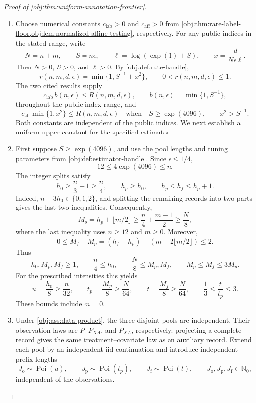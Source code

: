 \documentclass[11pt]{article}
\begin{document}
\begin{proof}[Proof of \cref{obj:thm:uniform-annotation-frontier}]
\begin{enumerate}
\item Choose numerical constants \(c_{\mathrm{lab}}>0\) and \(c_{\mathrm{aff}}>0\) from \cref{obj:thm:rare-label-floor,obj:lem:normalized-affine-testing}, respectively. For any public indices in the stated range, write
\[
N=n+m,\qquad
S=n\epsilon,\qquad
\ell=\log(\exp(1)+S),\qquad
x=\frac{d}{N\epsilon\ell}.
\]
Then \(N>0\), \(S>0\), and \(\ell>0\). By \cref{obj:def:rate-handle},
\[
r(n,m,d,\epsilon)=\min\{1,S^{-1}+x^2\},
\qquad
0<r(n,m,d,\epsilon)\le1.
\]
The two cited results supply
\[
c_{\mathrm{lab}}\,b(n,\epsilon)
\le R(n,m,d,\epsilon),
\qquad
b(n,\epsilon)=\min\{1,S^{-1}\},
\]
throughout the public index range, and
\[
c_{\mathrm{aff}}\min\{1,x^2\}
\le R(n,m,d,\epsilon)
\quad\text{when}\quad
S\ge\exp(4096),\qquad x^2>S^{-1}.
\]
Both constants are independent of the public indices. We next establish a uniform upper constant for the specified estimator.

\item First suppose \(S\ge\exp(4096)\), and use the pool lengths and tuning parameters from \cref{obj:def:estimator-handle}. Since \(\epsilon\le1/4\),
\[
12\le4\exp(4096)\le n.
\]
The integer splits satisfy
\[
h_0\ge\frac n3-1\ge\frac n4,\qquad
h_p\ge h_0,\qquad
h_p\le h_f\le h_p+1.
\]
Indeed, \(n-3h_0\in\{0,1,2\}\), and splitting the remaining records into two parts gives the last two inequalities. Consequently,
\[
M_p
=h_p+\lfloor m/2\rfloor
\ge\frac n4+\frac{m-1}{2}
\ge\frac N8,
\]
where the last inequality uses \(n\ge12\) and \(m\ge0\). Moreover,
\[
0\le M_f-M_p
=(h_f-h_p)+(m-2\lfloor m/2\rfloor)\le2.
\]
Thus
\[
h_0,M_p,M_f\ge1,\qquad
\frac n4\le h_0,\qquad
\frac N8\le M_p,M_f,\qquad
M_p\le M_f\le3M_p.
\]
For the prescribed intensities this yields
\[
u=\frac{h_0}{8}\ge\frac n{32},\qquad
t_p=\frac{M_p}{8}\ge\frac N{64},\qquad
t=\frac{M_f}{8}\ge\frac N{64},\qquad
\frac13\le\frac t{t_p}\le3.
\]
These bounds include \(m=0\).

\item Under \cref{obj:ass:data-product}, the three disjoint pools are independent. Their observation laws are \(P\), \(P_{XA}\), and \(P_{XA}\), respectively: projecting a complete record gives the same treatment--covariate law as an auxiliary record. Extend each pool by an independent iid continuation and introduce independent prefix lengths
\[
J_{\mathrm o}\sim\operatorname{Poi}(u),\qquad
J_{\mathrm p}\sim\operatorname{Poi}(t_p),\qquad
J_{\mathrm f}\sim\operatorname{Poi}(t),
\qquad
J_{\mathrm o},J_{\mathrm p},J_{\mathrm f}\in\mathbb N_0,
\]
independent of the observations.


\end{enumerate}
\end{proof}
\end{document}
